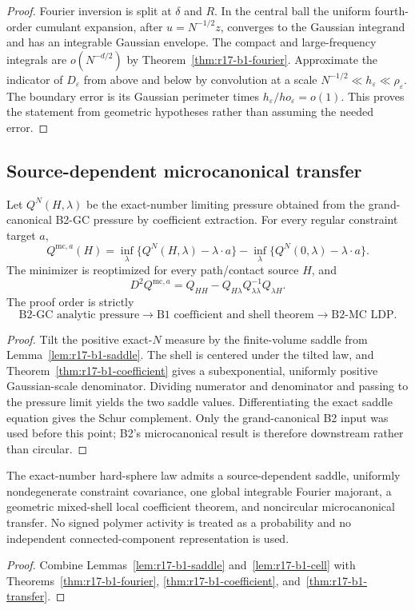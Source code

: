 \begin{proof}
Fourier inversion is split at $\delta$ and $R$.  In the central ball the
uniform fourth-order cumulant expansion, after $u=N^{-1/2}z$, converges to the
Gaussian integrand and has an integrable Gaussian envelope.  The compact and
large-frequency integrals are $o(N^{-d/2})$ by
Theorem~\ref{thm:r17-b1-fourier}.  Approximate the indicator of
$D_\varepsilon$ from above and below by convolution at a scale
$N^{-1/2}\ll h_\varepsilon\ll\rho_\varepsilon$.  The boundary error is its
Gaussian perimeter times $h_\varepsilon/
ho_\varepsilon=o(1)$.  This proves
the statement from geometric hypotheses rather than assuming the needed
error.
\end{proof}

\subsection{Source-dependent microcanonical transfer}

\begin{theorem}
\label{thm:r17-b1-transfer}
Let $Q^{N}(H,\lambda)$ be the exact-number limiting pressure obtained from the
grand-canonical B2-GC pressure by coefficient extraction.  For every regular
constraint target $a$,
\[
 Q^{\mathrm{mc},a}(H)=
 \inf_\lambda\{Q^{N}(H,\lambda)-\lambda\cdot a\}
 -\inf_\lambda\{Q^{N}(0,\lambda)-\lambda\cdot a\}.
\]
The minimizer is reoptimized for every path/contact source $H$, and
\[
 D^2Q^{\mathrm{mc},a}
 =Q_{HH}-Q_{H\lambda}Q_{\lambda\lambda}^{-1}Q_{\lambda H}.
\]
The proof order is strictly
\[
 \text{B2-GC analytic pressure}\longrightarrow
 \text{B1 coefficient and shell theorem}\longrightarrow
 \text{B2-MC LDP}.
\]
\end{theorem}

\begin{proof}
Tilt the positive exact-$N$ measure by the finite-volume saddle from
Lemma~\ref{lem:r17-b1-saddle}.  The shell is centered under the tilted law,
and Theorem~\ref{thm:r17-b1-coefficient} gives a subexponential, uniformly
positive Gaussian-scale denominator.  Dividing numerator and denominator and
passing to the pressure limit yields the two saddle values.  Differentiating
the exact saddle equation gives the Schur complement.  Only the
grand-canonical B2 input was used before this point; B2's microcanonical
result is therefore downstream rather than circular.
\end{proof}

\begin{theorem}
\label{thm:r17-b1-main}
The exact-number hard-sphere law admits a source-dependent saddle, uniformly
nondegenerate constraint covariance, one global integrable Fourier majorant,
a geometric mixed-shell local coefficient theorem, and noncircular
microcanonical transfer.  No signed polymer activity is treated as a
probability and no independent connected-component representation is used.
\end{theorem}

\begin{proof}
Combine Lemmas~\ref{lem:r17-b1-saddle} and~\ref{lem:r17-b1-cell} with
Theorems~\ref{thm:r17-b1-fourier},
\ref{thm:r17-b1-coefficient}, and~\ref{thm:r17-b1-transfer}.
\end{proof}
